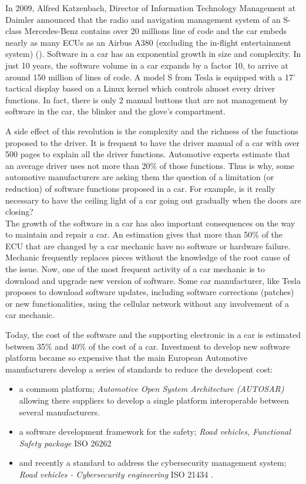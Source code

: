 In 2009, Alfred Katzenbach, Director of Information Technology Management at Daimler announced that the radio and navigation management system of an S-class Mercedes-Benz contains over 20 millions line of code and the car embeds nearly as many ECUs as an Airbus A380 (excluding the in-flight entertainment system) (\cite{Cha2009}). Software in a car has an exponential growth in size and complexity. In just 10 years, the software volume in a car expands by a factor 10, to arrive at around 150 million of lines of code. A model S from Tesla is equipped with a 17' tactical display based on a Linux kernel which controls almost every driver functions. In fact, there is only 2 manual buttons that are not management by software in the car, the blinker and the glove's compartment.


A side effect of this revolution is the complexity and the richness of the functions proposed to the driver. It is frequent to have the driver manual of a car with over 500 pages to explain all the driver functions. Automotive experts estimate that an average driver uses not more than 20\% of those functions. Thus is why, some automotive manufacturers are asking them the question of a limitation (or reduction) of software functions proposed in a car. For example, is it really necessary to have the ceiling light of a car going out gradually when the doors are closing?\\

The growth of the software in a car has also important consequences on the way to maintain and repair a car. An estimation gives that more than 50\% of the ECU that are changed by a car mechanic have no software or hardware failure. Mechanic frequently replaces pieces without the knowledge of the root cause of the issue. Now, one of the most frequent activity of a car mechanic is to download and upgrade new version of software. Some car manufacturer, like Tesla proposes to download software updates, including software corrections (patches) or new functionalities, using the cellular network without any involvement of a car mechanic.


Today, the cost of the software and the supporting electronic in a car is estimated between 35\% and 40\% of the cost of a car. Investment to develop new software platform became so expensive that the main European Automotive manufacturers develop a series of standards to reduce the developent cost:
\begin{itemize}
    \item a commom platform; \emph{Automotive Open System Architecture (AUTOSAR)} \cite{AUTOSAR} allowing there suppliers to develop a single platform interoperable between several manufacturers. 
    \item a software development framework for the safety; \emph{Road vehicles, Functional Safety package} ISO 26262 \cite{ISO26262}
    \item and recently a standard to address the cybersecurity management system; \emph{Road vehicles - Cybersecurity engineering} ISO 21434 \cite{ISO21434}.
\end{itemize}

